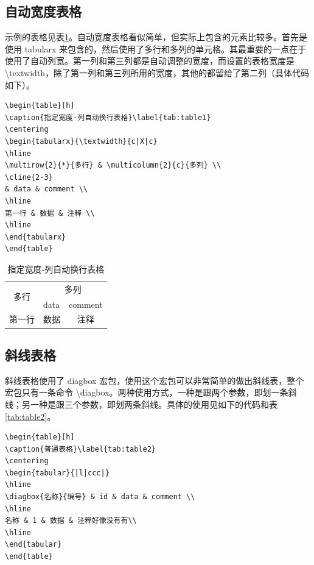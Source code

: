 \documentclass[a4paper,12pt]{ctexart}
\begin{document}
\subsection{自动宽度表格}
示例的表格见表\ref{tab:table1}。自动宽度表格看似简单，但实际上包含的元素比较多。首先是使用 tabularx 来包含的，然后使用了多行和多列的单元格。其最重要的一点在于使用了自动列宽。第一列和第三列都是自动调整的宽度，而设置的表格宽度是 \textbackslash{}textwidth，除了第一列和第三列所用的宽度，其他的都留给了第二列（具体代码如下）。

\begin{verbatim}
\begin{table}[h]
\caption{指定宽度-列自动换行表格}\label{tab:table1}
\centering
\begin{tabularx}{\textwidth}{c|X|c}
\hline
\multirow{2}{*}{多行} & \multicolumn{2}{c}{多列} \\
\cline{2-3}
& data & comment \\
\hline
第一行 & 数据 & 注释 \\
\hline
\end{tabularx}
\end{table}
\end{verbatim}

\begin{table}[h]
\caption{指定宽度-列自动换行表格}\label{tab:table1}
\centering
\begin{tabularx}{\textwidth}{c|X|c}
\hline
\multirow{2}{*}{多行} & \multicolumn{2}{c}{多列} \\
\cline{2-3}
& data & comment \\
\hline
第一行 & 数据 & 注释 \\
\hline
\end{tabularx}
\end{table}

\subsection{斜线表格}
斜线表格使用了 diagbox 宏包，使用这个宏包可以非常简单的做出斜线表，整个宏包只有一条命令 \textbackslash{}diagbox。两种使用方式，一种是跟两个参数，即划一条斜线；另一种是跟三个参数，即划两条斜线。具体的使用见如下的代码和表\ref{tab:table2}。

\begin{verbatim}
\begin{table}[h]
\caption{普通表格}\label{tab:table2}
\centering
\begin{tabular}{|l|ccc|}
\hline
\diagbox{名称}{编号} & id & data & comment \\
\hline
名称 & 1 & 数据 & 注释好像没有有\\
\hline
\end{tabular}
\end{table}
\end{verbatim}
\end{document}
